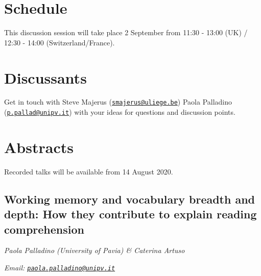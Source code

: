 \documentclass[
  12pt,
]{book}
\begin{document}
\hypertarget{schedule-2}{%
\section{Schedule}\label{schedule-2}}

This discussion session will take place 2 September from 11:30 - 13:00 (UK) / 12:30 - 14:00 (Switzerland/France).

\hypertarget{discussants-2}{%
\section{Discussants}\label{discussants-2}}

Get in touch with Steve Majerus (\href{mailto:smajerus@uliege.be}{\nolinkurl{smajerus@uliege.be}}) Paola Palladino (\href{mailto:p.pallad@unipv.it}{\nolinkurl{p.pallad@unipv.it}}) with your ideas for questions and discussion points.

\hypertarget{abstracts-2}{%
\section{Abstracts}\label{abstracts-2}}

Recorded talks will be available from 14 August 2020.

\hypertarget{working-memory-and-vocabulary-breadth-and-depth-how-they-contribute-to-explain-reading-comprehension}{%
\subsection{Working memory and vocabulary breadth and depth: How they contribute to explain reading comprehension}\label{working-memory-and-vocabulary-breadth-and-depth-how-they-contribute-to-explain-reading-comprehension}}

\emph{Paola Palladino (University of Pavia) \& Caterina Artuso}

\emph{Email: \href{mailto:paola.palladino@unipv.it}{\nolinkurl{paola.palladino@unipv.it}}}
\end{document}
